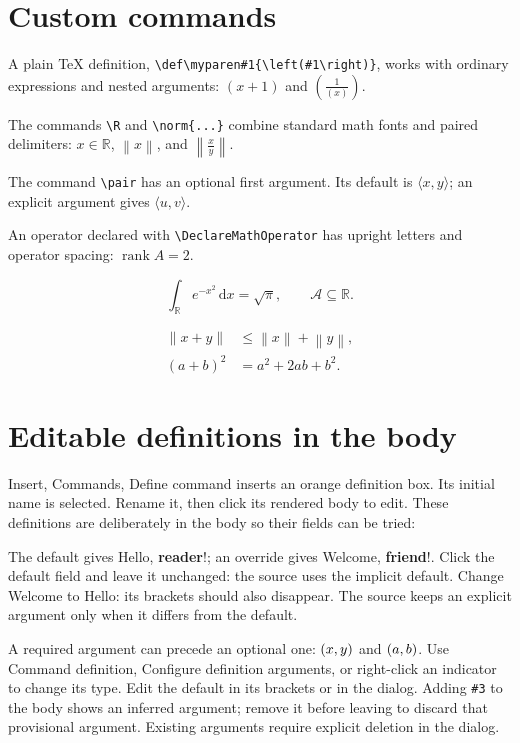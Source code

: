 \documentclass{article}
\def\myparen#1{\left(#1\right)}
\newcommand{\R}{\mathbb{R}}
\newcommand{\norm}[1]{\left\lVert #1\right\rVert}
\newcommand{\pair}[2][x]{\langle #1,#2\rangle}
\newcommand{\diff}{\mathrm{d}}
\DeclareMathOperator{\rank}{rank}
\begin{document}
\section{Custom commands}

A plain TeX definition, \verb|\def\myparen#1{\left(#1\right)}|,
works with ordinary expressions and nested arguments:
$\myparen{x+1}$ and $\myparen{\frac{1}{\myparen{x}}}$.

The commands \verb|\R| and \verb|\norm{...}| combine standard math fonts
and paired delimiters: $x\in\R$, $\norm{x}$, and
$\norm{\frac{x}{y}}$.

The command \verb|\pair| has an optional first argument.
Its default is $\pair{y}$; an explicit argument gives $\pair[u]{v}$.

An operator declared with \verb|\DeclareMathOperator| has upright letters
and operator spacing: $\rank A=2$.

\[
\int_{\R} e^{-x^2}\,\diff x=\sqrt{\pi},
\qquad \mathcal{A}\subseteq\R.
\]

\begin{align*}
\norm{x+y}&\leq\norm{x}+\norm{y},\\
\myparen{a+b}^2&=a^2+2ab+b^2.
\end{align*}

\section{Editable definitions in the body}
Insert, Commands, Define command inserts an orange definition box.
Its initial name is selected. Rename it, then click its rendered body to edit.
These definitions are deliberately in the body so their fields can be tried:

\newcommand{\welcome}[2][Hello]{#1, \textbf{#2}!}

The default gives \welcome{reader}; an override gives \welcome[Welcome]{friend}.
Click the default field and leave it unchanged: the source uses the implicit
default. Change Welcome to Hello: its brackets should also disappear.
The source keeps an explicit argument only when it differs from the default.


A required argument can precede an optional one: $\orderedpair{x}$ and
$\orderedpair{a}[b]$. Use Command definition, Configure definition arguments, or right-click an
indicator to change its type. Edit the default in its brackets or in the dialog.
Adding \verb|#3| to the body shows an inferred argument; remove it before
leaving to discard that provisional argument. Existing arguments require explicit deletion in the dialog.
\end{document}

